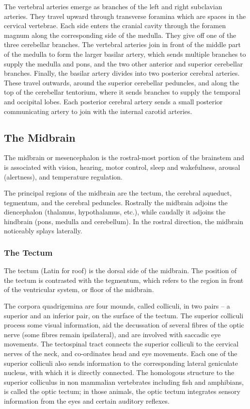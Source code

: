 \documentclass[]{book}
\begin{document}
The vertebral arteries emerge as branches of the left and right subclavian arteries. They travel upward through transverse foramina which are spaces in the cervical vertebrae. Each side enters the cranial cavity through the foramen magnum along the corresponding side of the medulla. They give off one of the three cerebellar branches. The vertebral arteries join in front of the middle part of the medulla to form the larger basilar artery, which sends multiple branches to supply the medulla and pons, and the two other anterior and superior cerebellar branches. Finally, the basilar artery divides into two posterior cerebral arteries. These travel outwards, around the superior cerebellar peduncles, and along the top of the cerebellar tentorium, where it sends branches to supply the temporal and occipital lobes. Each posterior cerebral artery sends a small posterior communicating artery to join with the internal carotid arteries.

\hypertarget{the-midbrain}{%
\subsection{The Midbrain}\label{the-midbrain}}

The midbrain or mesencephalon is the rostral-most portion of the brainstem and is associated with vision, hearing, motor control, sleep and wakefulness, arousal (alertness), and temperature regulation.

The principal regions of the midbrain are the tectum, the cerebral aqueduct, tegmentum, and the cerebral peduncles. Rostrally the midbrain adjoins the diencephalon (thalamus, hypothalamus, etc.), while caudally it adjoins the hindbrain (pons, medulla and cerebellum). In the rostral direction, the midbrain noticeably splays laterally.

\hypertarget{the-tectum}{%
\subsubsection{The Tectum}\label{the-tectum}}

The tectum (Latin for roof) is the dorsal side of the midbrain. The position of the tectum is contrasted with the tegmentum, which refers to the region in front of the ventricular system, or floor of the midbrain.

The corpora quadrigemina are four mounds, called colliculi, in two pairs -- a superior and an inferior pair, on the surface of the tectum. The superior colliculi process some visual information, aid the decussation of several fibres of the optic nerve (some fibres remain ipsilateral), and are involved with saccadic eye movements. The tectospinal tract connects the superior colliculi to the cervical nerves of the neck, and co-ordinates head and eye movements. Each one of the superior colliculi also sends information to the corresponding lateral geniculate nucleus, with which it is directly connected. The homologous structure to the superior colliculus in non mammalian vertebrates including fish and amphibians, is called the optic tectum; in those animals, the optic tectum integrates sensory information from the eyes and certain auditory reflexes.
\end{document}
